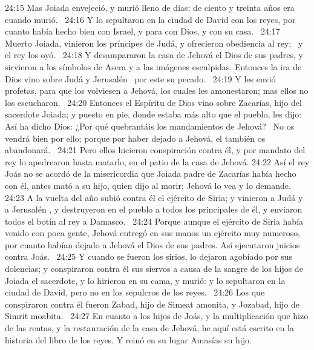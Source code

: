 																								24:15 Mas Joiada envejeció, y murió lleno de días: de ciento y treinta años era cuando murió.  
																								24:16 Y lo sepultaron en la ciudad de David con los reyes, por cuanto había hecho bien con Israel, y para con Dios, y con su casa.  
																								24:17 Muerto Joiada, vinieron los príncipes de Judá, y ofrecieron obediencia al rey;  y el rey los oyó.  
																								24:18 Y desampararon la casa de Jehová el Dios de sus padres, y sirvieron a los símbolos de Asera y a las imágenes esculpidas. Entonces la ira de Dios vino sobre Judá y Jerusalén  por este su pecado.  
																								24:19 Y les envió profetas, para que los volviesen a Jehová, los cuales les amonestaron; mas ellos no los escucharon.  
																								24:20 Entonces el Espíritu de Dios vino sobre Zacarías, hijo del sacerdote Joiada; y puesto en pie, donde estaba más alto que el pueblo, les dijo: Así ha dicho Dios: ¿Por qué quebrantáis los mandamientos de Jehová?  No os vendrá bien por ello; porque por haber dejado a Jehová, el también os abandonará.  
																								24:21 Pero ellos hicieron conspiración contra él, y por mandato del rey lo apedrearon hasta matarlo, en el patio de la casa de Jehová. 
																								24:22 Así el rey Joás no se acordó de la misericordia que Joiada padre de Zacarías había hecho con él, antes mató a su hijo, quien dijo al morir: Jehová lo vea y lo demande.  
																								24:23 A la vuelta del año subió contra él el ejército de Siria; y vinieron a Judá y a Jerusalén , y destruyeron en el pueblo a todos los principales de él, y enviaron todos el botín al rey a Damasco.  
																								24:24 Porque aunque el ejército de Siria había venido con poca gente, Jehová entregó en sus manos un ejército muy numeroso, por cuanto habían dejado a Jehová el Dios de sus padres. Así ejecutaron juicios contra Joás.  
																								24:25 Y cuando se fueron los sirios, lo dejaron agobiado por sus dolencias; y conspiraron contra él sus siervos a causa de la sangre de los hijos de Joiada el sacerdote, y lo hirieron en su cama, y murió: y lo sepultaron en la ciudad de David, pero no en los sepulcros de los reyes.  
																								24:26 Los que conspiraron contra él fueron Zabad, hijo de Simeat amonita, y Jozabad, hijo de Simrit moabita.  
																								24:27 En cuanto a los hijos de Joás, y la multiplicación que hizo de las rentas, y la restauración de la casa de Jehová, he aquí está escrito en la historia del libro de los reyes. Y reinó en su lugar Amasías su hijo.  
